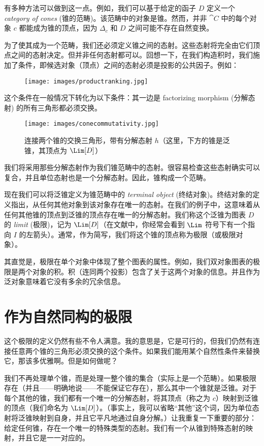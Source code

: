 有多种方法可以做到这一点。例如，我们可以基于给定的函子 $D$ 定义一个 \emph{category of cones} (锥的范畴)。该范畴中的对象是锥。然而，并非 $\cat{C}$ 中的每个对象 $c$ 都能成为锥的顶点，因为 $\Delta_c$ 和 $D$ 之间可能不存在自然变换。

为了使其成为一个范畴，我们还必须定义锥之间的态射。这些态射将完全由它们顶点之间的态射决定。但并非任何态射都可以。回想一下，在我们构造积时，我们施加了条件，即候选对象（顶点）之间的态射必须是投影的公共因子。例如：


\begin{figure}[H]
  \centering
  \texttt{[image: images/productranking.jpg]}
\end{figure}

这个条件在一般情况下转化为以下条件：其一边是 factorizing morphism (分解态射) 的所有三角形都必须交换。

\begin{figure}[H]
  \centering
  \texttt{[image: images/conecommutativity.jpg]}
  \caption{连接两个锥的交换三角形，带有分解态射 $h$（这里，下方的锥是泛锥，其顶点为 $\Lim[D]$）}
\end{figure}

\noindent
我们将采用那些分解态射作为我们锥范畴中的态射。很容易检查这些态射确实可以复合，并且单位态射也是一个分解态射。因此，锥构成一个范畴。

现在我们可以将泛锥定义为锥范畴中的 \emph{terminal object} (终结对象)。终结对象的定义指出，从任何其他对象到该对象存在唯一的态射。在我们的例子中，这意味着从任何其他锥的顶点到泛锥的顶点存在唯一的分解态射。我们称这个泛锥为图表 $D$ 的 \emph{limit} (极限)，记为 $\Lim[D]$（在文献中，你经常会看到 $\Lim$ 符号下有一个指向 $I$ 的左箭头）。通常，作为简写，我们将这个锥的顶点称为极限（或极限对象）。

其直觉是，极限在单个对象中体现了整个图表的属性。例如，我们双对象图表的极限是两个对象的积。积（连同两个投影）包含了关于这两个对象的信息。并且作为泛对象意味着它没有多余的冗余信息。

\section{作为自然同构的极限}

这个极限的定义仍然有些不令人满意。我的意思是，它是可行的，但我们仍然有连接任意两个锥的三角形必须交换的这个条件。如果我们能用某个自然性条件来替换它，那该多优雅啊。但是如何做呢？

我们不再处理单个锥，而是处理一整个锥的集合（实际上是一个范畴）。如果极限存在（并且——明确地说——不能保证它存在），那么其中一个锥就是泛锥。对于每个其他的锥，我们都有一个唯一的分解态射，将其顶点（称之为 $c$）映射到泛锥的顶点（我们命名为 $\Lim[D]$）。（事实上，我可以省略“其他”这个词，因为单位态射将泛锥映射到自身，并且它平凡地通过自身分解。）让我重复一下重要的部分：给定任何锥，存在一个唯一的特殊类型的态射。我们有一个从锥到特殊态射的映射，并且它是一一对应的。

